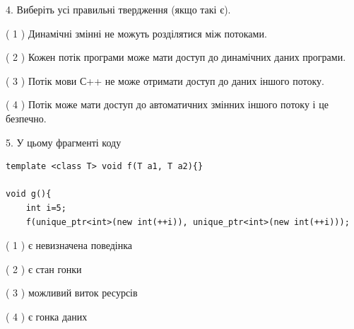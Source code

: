 \documentclass[12pt, ukrainian]{article}
\begin{document}
\begin {large}
{%
4. Виберіть усі правильні твердження (якщо такі є).\par
\vspace{2mm}

( 1 ) Динамічні змінні не можуть розділятися між потоками.%

( 2 ) Кожен потік програми може мати доступ до динамічних даних програми.%

( 3 ) Потік мови С++ не може отримати доступ до даних іншого потоку.%

( 4 ) Потік може мати доступ до автоматичних змінних іншого потоку і це безпечно.%


5. У цьому фрагменті коду
\begin{verbatim}
template <class T> void f(T a1, T a2){}

void g(){
    int i=5;
    f(unique_ptr<int>(new int(++i)), unique_ptr<int>(new int(++i)));
\end{verbatim}

( 1 ) є невизначена поведінка%

( 2 ) є стан гонки%

( 3 ) можливий виток ресурсів%

( 4 ) є гонка даних%
}
\end {large}
\end{document}
